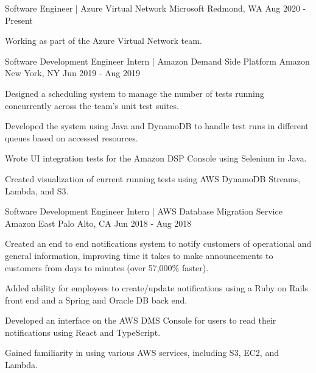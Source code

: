 

\begin{cventries}

  \cventry
  {Software Engineer | Azure Virtual Network} %
  {Microsoft} %
  {Redmond, WA} %
  {Aug 2020 - Present} %
  {
    \begin{cvitems} %
      \item {Working as part of the Azure Virtual Network team.}
    \end{cvitems}
  }

  \cventry
  {Software Development Engineer Intern | Amazon Demand Side Platform} %
  {Amazon} %
  {New York, NY} %
  {Jun 2019 - Aug 2019} %
  {
    \begin{cvitems} %
      \item {Designed a scheduling system to manage the number of tests running concurrently across the team's unit test suites.}
      \item {Developed the system using Java and DynamoDB to handle test runs in different queues based on accessed resources.}
      \item {Wrote UI integration tests for the Amazon DSP Console using Selenium in Java.}
      \item {Created visualization of current running tests using AWS DynamoDB Streams, Lambda, and S3.}
    \end{cvitems}
  }

  \cventry
  {Software Development Engineer Intern | AWS Database Migration Service} %
  {Amazon} %
  {East Palo Alto, CA} %
  {Jun 2018 - Aug 2018} %
  {
    \begin{cvitems} %
      \item {Created an end to end notifications system to notify customers of operational and general information, improving time it takes to make announcements to customers from days to minutes (over 57,000\% faster).}
      \item {Added ability for employees to create/update notifications using a Ruby on Rails front end and a Spring and Oracle DB back end.}
      \item {Developed an interface on the AWS DMS Console for users to read their notifications using React and TypeScript.}
      \item {Gained familiarity in using various AWS services, including S3, EC2, and Lambda.}
    \end{cvitems}
  }


\end{cventries}
